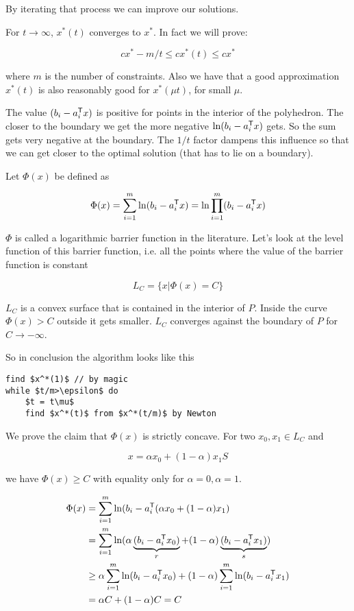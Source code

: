 By iterating that process we can improve our solutions.

For $t\rightarrow \infty$, $x^*(t)$ converges to $x^*$. In fact we will prove:

\[cx^* -m/t \leq cx^*(t) \leq cx^*\]

where $m$ is the number of constraints. Also we have that a good approximation $x^*(t)$ is also reasonably good for $x^*(\mu t)$, for small $\mu$.

The value $(b_i-{a}^\text{\upshape \sffamily T}_i x)$ is positive for points in the interior of the polyhedron. The closer to the boundary we get the more negative $\ln (b_i-{a}^\text{\upshape \sffamily T}_i x)$ gets. So the sum gets very negative at the boundary. The $1/t$ factor dampens this influence so that we can get closer to the optimal solution (that has to lie on a boundary).

Let $\Phi(x)$ be defined as

\[\Phi(x) = \sum_{i=1}^m \ln (b_i-{a}^\text{\upshape \sffamily T}_ix) = \ln \prod_{i=1}^m (b_i-{a}^\text{\upshape \sffamily T}_i x)\]

$\Phi$ is called a logarithmic barrier function in the literature. Let's look at the level function of this barrier function, i.e. all the points where the value of the barrier function is constant

\[L_C=\{x|\Phi(x)=C\}\]


$L_C$ is a convex surface that is contained in the interior of $P$. Inside the curve $\Phi(x)>C$ outside it gets smaller. $L_C$ converges against the boundary of $P$ for $C\rightarrow -\infty$. %

So in conclusion the algorithm looks like this

\begin{lstlisting}
find $x^*(1)$ // by magic
while $t/m>\epsilon$ do
	$t = t\mu$
	find $x^*(t)$ from $x^*(t/m)$ by Newton
\end{lstlisting}

We prove the claim that $\Phi(x)$ is strictly concave. For two $x_0,x_1\in L_C$ and

\[x=\alpha x_0+(1-\alpha)x_1S\]

we have $\Phi(x)\geq C$ with equality only for $\alpha=0, \alpha=1$.

\begin{align*}
\Phi(x) &= \sum_{i=1}^m\ln (b_i - {a}^\text{\upshape \sffamily T}_i (\alpha x_0+(1-\alpha)x_1)\\
	&= \sum_{i=1}^m\ln (\alpha\underbrace{(b_i-{a}^\text{\upshape \sffamily T}_i x_0)}_r +(1-\alpha) \underbrace{(b_i-{a}^\text{\upshape \sffamily T}_i x_1)}_s)\\
	&\geq \alpha \sum_{i=1}^m \ln (b_i-{a}^\text{\upshape \sffamily T}_i x_0) + (1-\alpha)\sum_{i=1}^m \ln (b_i-{a}^\text{\upshape \sffamily T}_i x_1)\\
	&=\alpha C +(1-\alpha)C = C
\end{align*}


